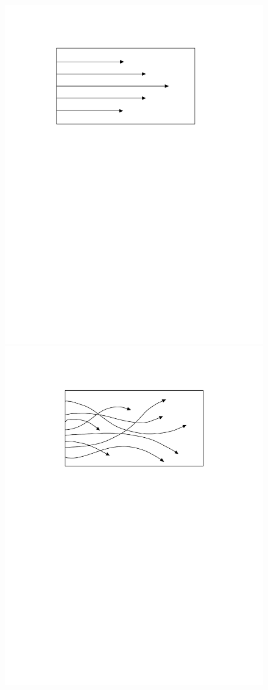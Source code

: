 \begin{figure}
\begin{center}
\includegraphics[scale=0.5]{figures/laminar}
\includegraphics[scale=0.503]{figures/turbulent}

\end{center}
\end{figure}
